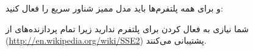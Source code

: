 {\begin{spacing}{1.5}
        \begin{flushleft}
        \end{flushleft}

        و برای همه پلتفرم‌ها باید مدل ممیز شناور سریع  را فعال کنید:

        \begin{flushleft}
        \end{flushleft}

        شما نیازی به فعال کردن  برای پلتفرم  ندارید زیرا تمام پردازنده‌های  از  (\url{http://en.wikipedia.org/wiki/SSE2}) پشتیبانی می‌کنند.
    \end{spacing}
}

